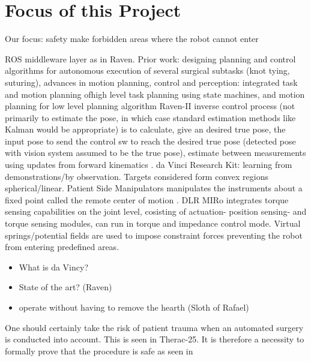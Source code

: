 \section{Focus of this Project}
Our focus:
safety
make forbidden areas where the robot cannot enter

ROS middleware layer as in Raven.
Prior work: designing planning and control algorithms for autonomous execution of several surgical subtasks (knot tying, suturing), advances in motion planning, control and perception: integrated task and motion planning ofhigh level task planning using state machines, and motion planning for low level planning algorithm  \citep{bib:raven_debride}
Raven-II inverse control process (not primarily to estimate the pose, in which case standard estimation methods like Kalman would be appropriate) is to calculate, give an desired true pose, the input pose to send the control sw to reach the desired true pose (detected pose with vision system assumed to be the true pose), estimate between measurements using updates from forward kinematics \citep{bib:raven_debride}.
da Vinci Research Kit: learning from demonstrations/by observation. Targets considered form convex regions spherical/linear. Patient Side Manipulators manipulates the instruments about a fixed point called the remote center of motion \citep{bib:raven_observ}.
DLR MIRo integrates torque sensing capabilities on the joint level, cosisting of actuation- position sensing- and torque sensing modules, can run in torque and impedance control mode. Virtual springs/potential fields are used to impose constraint forces preventing the robot from  entering predefined areas.



\begin{itemize}
\item What is da Vincy?
\item State of the art? (Raven)
\item operate without having to remove the hearth (Sloth of Rafael)
\end{itemize}
One should certainly take the risk of patient trauma when an automated surgery is conducted into account. This is seen in Therac-25. It is therefore a necessity to formally prove that the procedure is safe as seen in \citep{bib:safety}